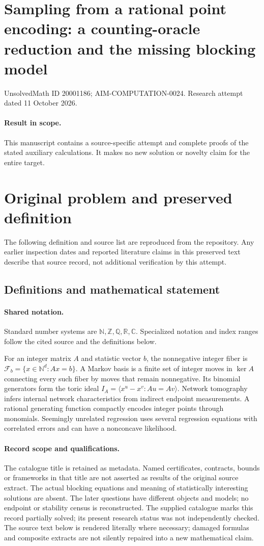 \documentclass[11pt]{article}
\begin{document}
\section*{Sampling from a rational point encoding: a counting-oracle reduction and the missing blocking model}
\noindent UnsolvedMath ID 20001186; AIM-COMPUTATION-0024. Research attempt dated 11 October 2026.
\paragraph{Result in scope.}This manuscript contains a source-specific attempt and complete proofs of the stated auxiliary calculations. It makes no new solution or novelty claim for the entire target.
\section{Original problem and preserved definition}
The following definition and source list are reproduced from the repository. Any earlier inspection dates and reported literature claims in this preserved text describe that source record, not additional verification by this attempt.
\subsection{Definitions and mathematical statement}

\paragraph{Shared notation.}Standard number systems are $\mathbb N,\mathbb Z,\mathbb Q,\mathbb R,\mathbb C$. Specialized notation and index ranges follow the cited source and the definitions below.


For an integer matrix $A$ and statistic vector $b$, the nonnegative integer fiber is $\mathcal F_b=\{x\in\mathbb N^d:Ax=b\}$. A Markov basis is a finite set of integer moves in $\ker A$ connecting every such fiber by moves that remain nonnegative. Its binomial generators form the toric ideal $I_A=\langle x^u-x^v:Au=Av\rangle$. Network tomography infers internal network characteristics from indirect endpoint measurements. A rational generating function compactly encodes integer points through monomials. Seemingly unrelated regression uses several regression equations with correlated errors and can have a nonconcave likelihood.
\paragraph{Record scope and qualifications.}
The catalogue title is retained as metadata. Named certificates, contracts, bounds or frameworks in that title are not asserted as results of the original source extract.
The actual blocking equations and meaning of statistically interesting solutions are absent. The later questions have different objects and models; no endpoint or stability census is reconstructed. The supplied catalogue marks this record partially solved; its present research status was not independently checked.
The source text below is rendered literally where necessary; damaged formulas and composite extracts are not silently repaired into a new mathematical claim.
\end{document}
